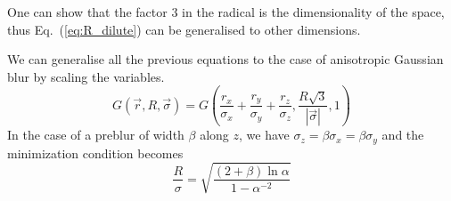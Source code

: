 One can show that the factor $3$ in the radical is the dimensionality of the space, thus Eq.~(\ref{eq:R_dilute}) can be generalised to other dimensions.

We can generalise all the previous equations to the case of anisotropic Gaussian blur by scaling the variables.
\begin{equation}
	G(\vec{r}, R, \vec{\sigma}) = G(\frac{r_x}{\sigma_x}+\frac{r_y}{\sigma_y}+\frac{r_z}{\sigma_z}, \frac{R\sqrt{3}}{|\vec{\sigma}|}, 1)
\end{equation}
In the case of a preblur of width $\beta$ along $z$, we have $\sigma_z=\beta\sigma_x=\beta\sigma_y$ and the minimization condition becomes
\begin{equation}
\frac{R}{\sigma} = \sqrt{\frac{(2+\beta)\ln \alpha}{1-\alpha^{-2}}} \label{eq:R_dilute_aniso}
\end{equation}

%



